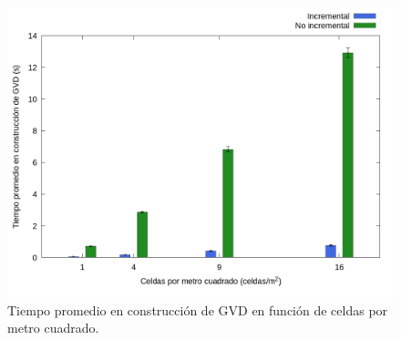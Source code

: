 \begin{figure}[H]
  \centerfloat
  \includegraphics[clip=true, width=\graphlen]{imagenes/graficas_chicas/graficas_histo_num/incrementalidad/gvd_construction_time_mean.png}
  \caption{Tiempo promedio en construcción de GVD en función de celdas por metro cuadrado.}\label{fig:gra:inc:gvdt}
\end{figure}


